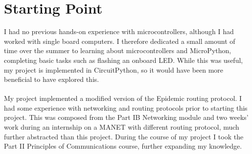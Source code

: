 \documentclass[12pt,a4paper]{report}
\begin{document}
\section{Starting Point} 
I had no previous hands-on experience with microcontrollers, although I had worked with single board computers. I therefore dedicated a small amount of time over the summer to learning about microcontrollers and MicroPython, completing basic tasks such as flashing an onboard LED. While this was useful, my project is implemented in CircuitPython, so it would have been more beneficial to have explored this. \\ \\
My project implemented a modified version of the Epidemic routing protocol. I had some experience with networking and routing protocols prior to starting this project. This was composed from the Part IB Networking module and two weeks' work during an internship on a MANET with different routing protocol, much further abstracted than this project. During the course of my project I took the Part II Principles of Communications course, further expanding my knowledge. 
\end{document}
